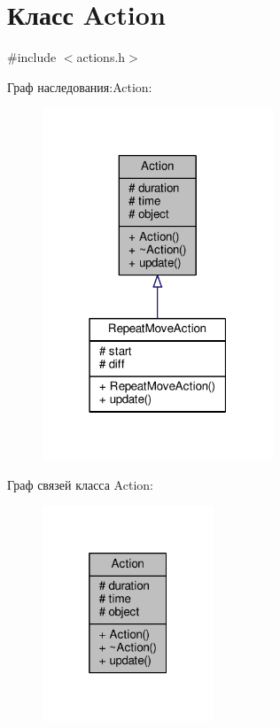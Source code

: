 \hypertarget{class_action}{}\section{Класс Action}
\label{class_action}


{\ttfamily \#include $<$actions.\+h$>$}



Граф наследования\+:Action\+:
\nopagebreak
\begin{figure}[H]
\begin{center}
\leavevmode
\includegraphics[width=195pt]{d2/d05/class_action__inherit__graph}
\end{center}
\end{figure}


Граф связей класса Action\+:
\nopagebreak
\begin{figure}[H]
\begin{center}
\leavevmode
\includegraphics[width=145pt]{db/d84/class_action__coll__graph}
\end{center}
\end{figure}
